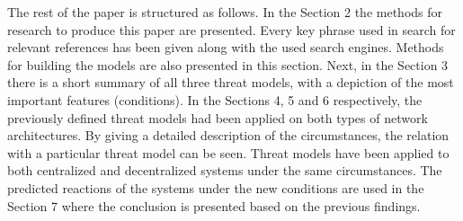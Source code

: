 The rest of the paper is structured as follows. In the Section 2 the methods for research to produce this paper are presented. Every key phrase used in search for relevant references has been given along with the used search engines. Methods for building the models are also presented in this section. Next, in the Section 3 there is a short summary of all three threat models, with a depiction of the most important features (conditions). In the Sections 4, 5 and 6 respectively, the previously defined threat models had been applied on both types of network architectures. By giving a detailed description of the circumstances, the relation with a particular threat model can be seen. Threat models have been applied to both centralized and decentralized systems under the same circumstances. The predicted reactions of the systems under the new conditions are used in the Section 7 where the conclusion is presented based on the previous findings.
